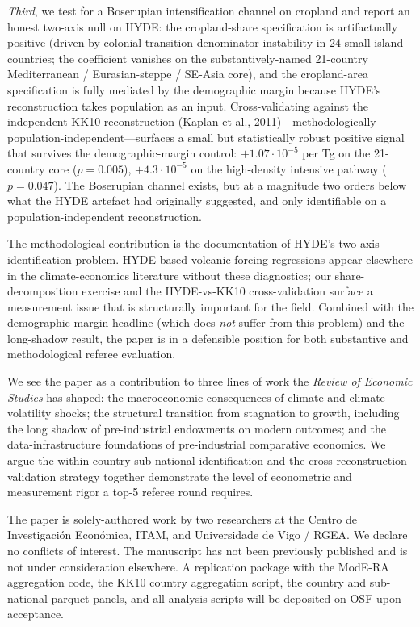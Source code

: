 \documentclass[11pt,letterpaper]{article}
\begin{document}
\emph{Third}, we test for a Boserupian intensification channel on cropland and report an honest two-axis null on HYDE: the cropland-share specification is artifactually positive (driven by colonial-transition denominator instability in 24 small-island countries; the coefficient vanishes on the substantively-named 21-country Mediterranean / Eurasian-steppe / SE-Asia core), and the cropland-area specification is fully mediated by the demographic margin because HYDE's reconstruction takes population as an input. Cross-validating against the independent KK10 reconstruction (Kaplan et al., 2011)---methodologically population-independent---surfaces a small but statistically robust positive signal that survives the demographic-margin control: $+1.07\!\cdot\!10^{-5}$ per Tg on the 21-country core ($p=0.005$), $+4.3\!\cdot\!10^{-5}$ on the high-density intensive pathway ($p=0.047$). The Boserupian channel exists, but at a magnitude two orders below what the HYDE artefact had originally suggested, and only identifiable on a population-independent reconstruction.

The methodological contribution is the documentation of HYDE's two-axis identification problem. HYDE-based volcanic-forcing regressions appear elsewhere in the climate-economics literature without these diagnostics; our share-decomposition exercise and the HYDE-vs-KK10 cross-validation surface a measurement issue that is structurally important for the field. Combined with the demographic-margin headline (which does \emph{not} suffer from this problem) and the long-shadow result, the paper is in a defensible position for both substantive and methodological referee evaluation.

We see the paper as a contribution to three lines of work the \emph{Review of Economic Studies} has shaped: the macroeconomic consequences of climate and climate-volatility shocks; the structural transition from stagnation to growth, including the long shadow of pre-industrial endowments on modern outcomes; and the data-infrastructure foundations of pre-industrial comparative economics. We argue the within-country sub-national identification and the cross-reconstruction validation strategy together demonstrate the level of econometric and measurement rigor a top-5 referee round requires.

The paper is solely-authored work by two researchers at the Centro de Investigaci\'on Econ\'omica, ITAM, and Universidade de Vigo / RGEA. We declare no conflicts of interest. The manuscript has not been previously published and is not under consideration elsewhere. A replication package with the ModE-RA aggregation code, the KK10 country aggregation script, the country and sub-national parquet panels, and all analysis scripts will be deposited on OSF upon acceptance.
\end{document}
